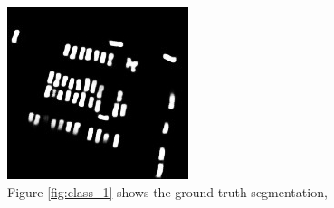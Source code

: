 \documentclass[a4paper,11pt]{article}
\begin{document}
\begin{figure}[H]
\endminipage\hfill
{}%
  \includegraphics[width=\linewidth]{gan_vs_class/gan_1}
\endminipage
\caption{Figure \ref{fig:class_1} shows the ground truth segmentation, }
\end{figure}
\end{document}
